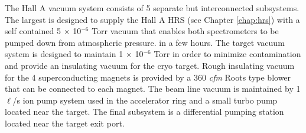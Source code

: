 

The Hall A vacuum system consists of 5 separate but interconnected 
subsystems.  The largest is designed to supply 
the Hall A HRS (see Chapter \ref{chap:hrs}) with a 
self contained 5 $\times$ 10$^{-6}$ Torr vacuum that enables both 
spectrometers to be pumped down from atmospheric pressure. in a few hours.  The target 
vacuum system is designed to maintain 1 $\times$ 10$^{-6}$ Torr in 
order to minimize contamination and provide an insulating vacuum for the 
cryo target.  Rough insulating vacuum for the 4 superconducting magnets 
is provided by a 360 \emph{cfm} Roots type blower that can be connected to each 
magnet.  The beam line vacuum is maintained by 1 $\ell$/s ion pump 
system used in the accelerator ring and a small turbo pump located near 
the target.  The final subsystem is a differential pumping station 
located near the target exit port.

